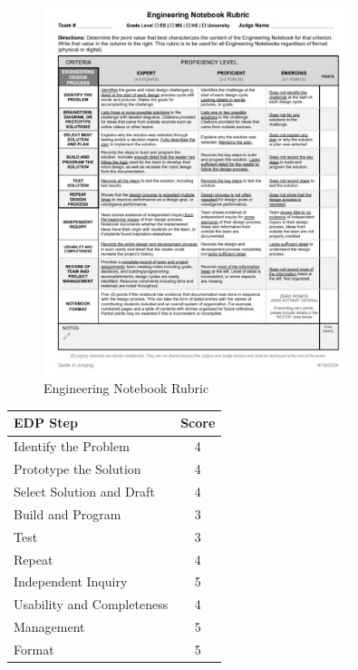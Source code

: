 \begin{figure}[H]
    \centering
    \includegraphics[width=0.8\textwidth]{images/engineeringnotebookrubric}
    \caption{Engineering Notebook Rubric}
    \label{fig:engineering-notebook-rubric}
\end{figure}

\begin{center}
\begin{tabular}{|l|c|}
\hline
\textbf{EDP Step} & \textbf{Score} \\
\hline
Identify the Problem & 4 \\
Prototype the Solution & 4 \\
Select Solution and Draft & 4 \\
Build and Program & 3 \\
Test & 3 \\
Repeat & 4 \\
Independent Inquiry & 5 \\
Usability and Completeness & 4 \\
Management & 5 \\
Format & 5 \\
\hline
\end{tabular}
\end{center}

